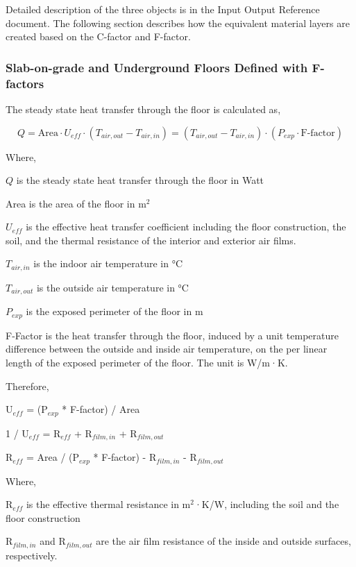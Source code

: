 Detailed description of the three objects is in the Input Output Reference document. The following section describes how the equivalent material layers are created based on the C-factor and F-factor.

\subsubsection{Slab-on-grade and Underground Floors Defined with F-factors}\label{slab-on-grade-and-underground-floors-defined-with-f-factors}

The steady state heat transfer through the floor is calculated as,

\begin{equation}
  Q = \text{Area} \cdot U_{eff} \cdot (T_{air,out} - T_{air,in}) = (T_{air,out} - T_{air,in}) \cdot (P_{exp} \cdot \text{F-factor})
\end{equation}

Where,

\(Q\) is the steady state heat transfer through the floor in Watt

Area is the area of the floor in m\(^{2}\)

\(U_{eff}\) is the effective heat transfer coefficient including the floor construction, the soil, and the thermal resistance of the interior and exterior air films.

\(T_{air,in}\) is the indoor air temperature in °C

\(T_{air,out}\) is the outside air temperature in °C

\(P_{exp}\) is the exposed perimeter of the floor in m

F-Factor is the heat transfer through the floor, induced by a unit temperature difference between the outside and inside air temperature, on the per linear length of the exposed perimeter of the floor. The unit is W/m·K.

Therefore,

U\(_{eff}\) = (P\(_{exp}\) * F-factor) / Area

1 / U\(_{eff}\) = R\(_{eff}\) + R\(_{film,in}\) + R\(_{film,out}\)

R\(_{eff}\) = Area / (P\(_{exp}\) * F-factor) - R\(_{film,in}\) - R\(_{film,out}\)

Where,

R\(_{eff}\) is the effective thermal resistance in m\(^{2}\)·K/W, including the soil and the floor construction

R\(_{film,in}\) and R\(_{film,out}\) are the air film resistance of the inside and outside surfaces, respectively.

